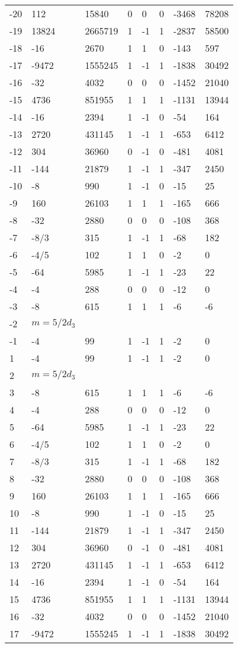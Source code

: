 \documentclass{amsart}
\begin{document}
\begin{longtable}{|l|l|l|lllll|}
-20&112&15840&0&0&0&-3468&78208\\
-19&13824&2665719&1&-1&1&-2837&58500\\
-18&-16&2670&1&1&0&-143&597\\
-17&-9472&1555245&1&-1&1&-1838&30492\\
-16&-32&4032&0&0&0&-1452&21040\\
-15&4736&851955&1&1&1&-1131&13944\\
-14&-16&2394&1&-1&0&-54&164\\
-13&2720&431145&1&-1&1&-653&6412\\
-12&304&36960&0&-1&0&-481&4081\\
-11&-144&21879&1&-1&1&-347&2450\\
-10&-8&990&1&-1&0&-15&25\\
-9&160&26103&1&1&1&-165&666\\
-8&-32&2880&0&0&0&-108&368\\
-7&-8/3&315&1&-1&1&-68&182\\
-6&-4/5&102&1&1&0&-2&0\\
-5&-64&5985&1&-1&1&-23&22\\
-4&-4&288&0&0&0&-12&0\\
-3&-8&615&1&1&1&-6&-6\\
-2&$m=5/2d_{3}$&&\multicolumn{5}{c|}{}\\
-1&-4&99&1&-1&1&-2&0\\
1&-4&99&1&-1&1&-2&0\\
2&$m=5/2d_{3}$&&\multicolumn{5}{c|}{}\\
3&-8&615&1&1&1&-6&-6\\
4&-4&288&0&0&0&-12&0\\
5&-64&5985&1&-1&1&-23&22\\
6&-4/5&102&1&1&0&-2&0\\
7&-8/3&315&1&-1&1&-68&182\\
8&-32&2880&0&0&0&-108&368\\
9&160&26103&1&1&1&-165&666\\
10&-8&990&1&-1&0&-15&25\\
11&-144&21879&1&-1&1&-347&2450\\
12&304&36960&0&-1&0&-481&4081\\
13&2720&431145&1&-1&1&-653&6412\\
14&-16&2394&1&-1&0&-54&164\\
15&4736&851955&1&1&1&-1131&13944\\
16&-32&4032&0&0&0&-1452&21040\\
17&-9472&1555245&1&-1&1&-1838&30492\\

\end{longtable}
\end{document}
